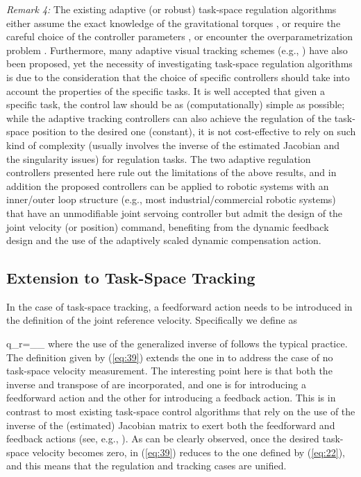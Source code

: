 \documentclass[9pt,technote]{IEEEtran}
\def \be {}
\begin{document}
\emph{Remark 4:} The existing adaptive (or robust) task-space regulation algorithms either assume the exact knowledge of the gravitational torques \cite{Cheah2006_IJRR,Liu2006_TRO}, or require the careful choice of the controller parameters \cite{Cheah2003_TRA,Cheah2010_AUT,Liang2014_ASJC}, or encounter the overparametrization problem \cite{Liang2014_ASJC}. Furthermore, many adaptive visual tracking schemes (e.g., \cite{Cheah2006_IJRR,Wang2010_TCST,Wang2015_AUT,Leite2011_IFAC}) have also been proposed, yet the necessity of investigating task-space regulation algorithms is due to the consideration that the choice of specific controllers should take into account the properties of the specific tasks. It is well accepted that given a specific task, the control law should be as (computationally) simple as possible; while the adaptive tracking controllers can also achieve the regulation of the task-space position to the desired one (constant), it is not cost-effective to rely on such kind of complexity (usually involves the inverse of the estimated Jacobian and the singularity issues) for regulation tasks. The two adaptive regulation controllers presented here rule out the limitations of the above results, and in addition the proposed controllers can be applied to robotic systems with an inner/outer loop structure (e.g., most industrial/commercial robotic systems) that have an unmodifiable joint servoing controller but admit the design of the joint velocity (or position) command, benefiting from the dynamic feedback design and the use of the adaptively scaled dynamic compensation action.

\subsection{Extension to Task-Space Tracking}

In the case of task-space tracking, a feedforward action needs to be introduced in the definition of the joint reference velocity. Specifically
we define  as
\be
\label{eq:39}
\dot q_r=__
\ee
where the use of the generalized inverse of  follows the typical practice. The definition given by (\ref{eq:39}) extends the one in \cite{Wang2016_TAC} to address the case of no task-space velocity measurement. The interesting point here is that both the inverse and transpose of  are incorporated, and one is for introducing a feedforward action and the other for introducing a feedback action. This is in contrast to most existing task-space control algorithms that rely on the use of the inverse of the (estimated) Jacobian matrix to exert both the feedforward and feedback actions (see, e.g., \cite{Slotine1987_IJRR,Niemeyer1991_IJRR,Wang2015_AUT}). As can be clearly observed, once the desired task-space velocity becomes zero,  in (\ref{eq:39}) reduces to the one defined by (\ref{eq:22}), and this means that the regulation and tracking cases are unified.
\end{document}
